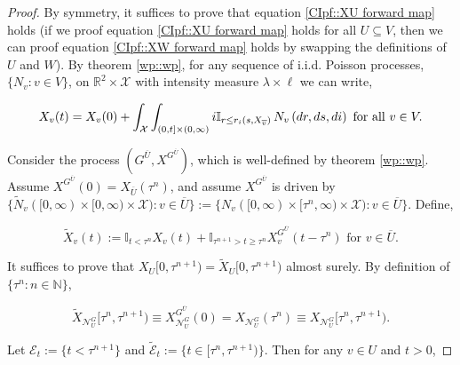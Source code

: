 \documentclass[12pt]{article}
\newcommand{\mb}{\mathbb}
\newcommand{\mc}{\mathcal}
\newcommand{\ov}{\overline}
\newcommand{\te}{\text}
\newcommand{\defeq}{:=}								%
\newcommand{\sta}{\mc{X}}							%
\newcommand{\gneigh}[2]{\mc{N}^{#1}_{#2}}			%
\newcommand{\cl}[1]{\ov{#1}}						%
\newcommand{\indx}[1]{^{#1}}						%
\newcommand{\Xf}{X}									%
\newcommand{\poiss}{N}								%
\newcommand{\leb}{\lambda}							%
\newcommand{\Sm}{\ell}								%
\newcommand{\rate}{r}								%
\newcommand{\poissv}[1]{_{#1}}						%
\newcommand{\vind}[1]{_{#1}}						%
\newcommand{\tme}[1]{(#1)}							%
\newcommand{\tmi}[1]{#1}							%
\newcommand{\gind}[1]{^{#1}}						%
\newcommand{\vpara}[1]{^{#1}}						%
\newcommand{\stpara}[1]{_{#1}}						%
\newcommand{\tpara}[1]{_{#1}}						%
\newcommand{\tmepro}[3]{
\ifstrempty{#3}{
	(#1,#2)}{
	(#1,#2,#3)}}									%
\newcommand{\seto}{U}								%
\newcommand{\sett}{W}								%
\newcommand{\evnt}{\mc{E}}						%
\newcommand{\indo}{n}							%
\newcommand{\alt}[1]{\tilde{#1}}					%
\newcommand{\rt}{\tau}								%
\begin{document}
\begin{proof}
By symmetry, it suffices to prove that equation \ref{CIpf::XU forward map} holds (if we proof equation \eqref{CIpf::XU forward map} holds for all \(\seto \subseteq V\), then we can proof equation \eqref{CIpf::XW forward map} holds by swapping the definitions of \(\seto\) and \(\sett\)). By theorem \ref{wp::wp}, for any sequence of i.i.d. Poisson processes, \(\{\poiss\poissv{v}:v\in V\}\), on \(\mb{R}^2\times \sta\) with intensity measure \(\leb\times\Sm\) we can write,

\[\Xf\vind{v}\tme{t} = \Xf\vind{v}\tme{0} + \int_\sta\int_{(0,t]\times (0,\infty)} i\mb{I}_{r\leq \rate\stpara{i}\tmepro{s}{\Xf\vind{\cl{v}}}{}}\,\poiss\poissv{v}\left(dr,ds,di\right)\te{ for all } v\in V.\]

Consider the process \((G\vpara{\cl{\seto}},\Xf\gind{G\vpara{\cl{\seto}}})\), which is well-defined by theorem \ref{wp::wp}. Assume \(\Xf\gind{G\vpara{\cl{\seto}}}\tme{0} = \Xf\vind{\cl{\seto}}\tme{\rt\indx{\indo}}\), and assume \(\Xf\gind{G\vpara{\cl{\seto}}}\) is driven by \(\{\alt{\poiss}\poissv{v}([0,\infty)\times [0,\infty)\times \sta):v \in \cl{\seto}\} \defeq \{\poiss\poissv{v}([0,\infty)\times [\rt\indx{\indo},\infty)\times \sta):v \in \cl{\seto}\}\). Define,

\[\alt{\Xf}\vind{v}\tme{t} \defeq \mb{I}_{t < \rt\indx{\indo}} \Xf\vind{v}\tme{t} + \mb{I}_{\rt\indx{\indo + 1} > t \geq \rt\indx{\indo}}\Xf\gind{G\vpara{\cl{\seto}}}\vind{v}\tme{t - \rt\indx{\indo}}\te{ for } v \in \cl{\seto}.\]

It suffices to prove that \(\Xf\vind{\seto}\tmi{[0,\rt\indx{\indo+1})} = \alt{\Xf}\vind{\seto}\tmi{[0,\rt\indx{\indo+1})}\) almost surely. By definition of \(\{\rt\indx{\indo}:\indo\in\mb{N}\}\), 

\[\alt{\Xf}\vind{\gneigh{G}{\seto}}\tmi{[\rt\indx{\indo},\rt\indx{\indo+1})} \equiv \Xf\gind{G\vpara{\cl{\seto}}}\vind{\gneigh{G}{\seto}}\tme{0} = \Xf\vind{\gneigh{G}{\seto}}\tme{\rt\indx{\indo}} \equiv \Xf\vind{\gneigh{G}{\seto}}\tmi{[\rt\indx{\indo},\rt\indx{\indo+1})}.\]

Let \(\evnt\tpara{t} \defeq \{t < \rt\indx{\indo+1}\}\) and \(\alt{\evnt}\tpara{t} \defeq \{t \in [\rt\indx{\indo},\rt\indx{\indo+1})\}\). Then for any \(v \in \seto\) and \(t > 0\),


\end{proof}
\end{document}
